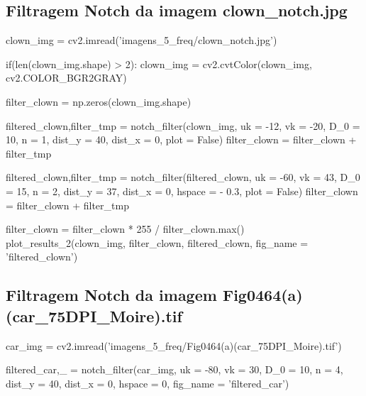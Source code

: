 \documentclass{article}
\begin{document}
\newpage
\subsection{Filtragem Notch da imagem clown\_notch.jpg}
\label{cod:clown}
\begin{python}
clown_img = cv2.imread('imagens_5_freq/clown_notch.jpg')

if(len(clown_img.shape) > 2):
	clown_img = cv2.cvtColor(clown_img, cv2.COLOR_BGR2GRAY)

filter_clown = np.zeros(clown_img.shape)

filtered_clown,filter_tmp = notch_filter(clown_img, uk = -12, vk = -20, D_0 = 10, n = 1, dist_y = 40, dist_x = 0, plot = False)
filter_clown = filter_clown + filter_tmp 

filtered_clown,filter_tmp = notch_filter(filtered_clown, uk = -60, vk = 43,  D_0 = 15, n = 2, dist_y = 37, dist_x = 0, hspace = - 0.3, plot = False)
filter_clown = filter_clown + filter_tmp

filter_clown = filter_clown * 255 / filter_clown.max()
plot_results_2(clown_img, filter_clown, filtered_clown, fig_name = 'filtered_clown')
\end{python}

\subsection{Filtragem Notch da imagem Fig0464(a)(car\_75DPI\_Moire).tif}
\label{cod:car}
\begin{python}
car_img = cv2.imread('imagens_5_freq/Fig0464(a)(car_75DPI_Moire).tif')

filtered_car,_ = notch_filter(car_img, uk = -80, vk = 30, D_0 = 10, n = 4, dist_y = 40, dist_x = 0, hspace = 0, fig_name = 'filtered_car')
\end{python}
\end{document}
